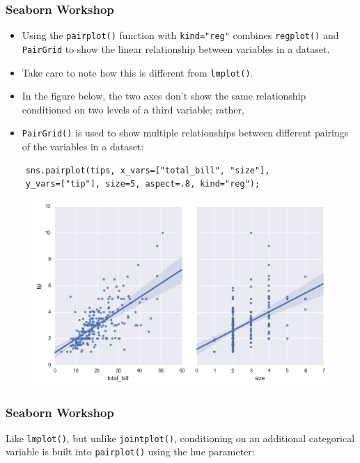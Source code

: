 \documentclass{beamer}
\begin{document}
\begin{frame}[fragile]
	\frametitle{Seaborn Workshop}
	\large
	\begin{itemize}
		\item Using the \texttt{pairplot()} function with \texttt{kind="reg"} combines \texttt{regplot()} and \texttt{PairGrid} to show the linear relationship between variables in a dataset.
		\item Take care to note how this is different from \texttt{lmplot()}. 
		\item In the figure below, the two axes don’t show the same relationship conditioned on two levels of a third variable; rather, \item \texttt{PairGrid()} is used to show multiple relationships between different pairings of the variables in a dataset:
	\end{itemize}
	
\end{frame}
\begin{frame}[fragile]
	\large
	\begin{verbatim}
	sns.pairplot(tips, x_vars=["total_bill", "size"],  
	y_vars=["tip"], size=5, aspect=.8, kind="reg");
	\end{verbatim}
	\begin{figure}
		\centering
		\includegraphics[width=0.8\linewidth]{images/regression_53_0}
	\end{figure}
	
\end{frame}
\begin{frame}[fragile]
	\frametitle{Seaborn Workshop}
	Like \texttt{lmplot()}, but unlike \texttt{jointplot()}, conditioning on an additional categorical variable is built into \texttt{pairplot()} using the hue parameter:
	
\end{frame}
\end{document}
